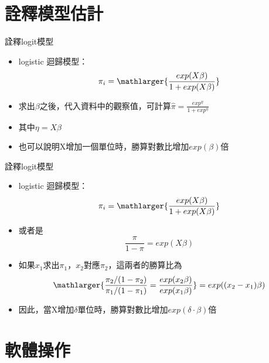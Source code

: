 \documentclass[border=10pt]{beamer}
\begin{document}
\section{詮釋模型估計}
\begin{frame}{詮釋logit模型}
\begin{itemize} 
\item  logistic 迴歸模型：
\begin{equation}
\pi_{i}=\mathlarger{\frac{exp(X\beta)}{1+exp(X\beta)}} 
\end{equation}
\item 求出$\beta$之後，代入資料中的觀察值，可計算$\hat{\pi}=\frac{exp^{\eta}}{1+exp^{\eta}}$
\item 其中$\eta=X\beta$
\item 也可以說明X增加一個單位時，勝算對數比增加$exp(\beta)$倍
\end{itemize}
\end{frame}
\begin{frame}{詮釋logit模型}
\begin{itemize} 
\item  logistic 迴歸模型：
\begin{equation}
\pi_{i}=\mathlarger{\frac{exp(X\beta)}{1+exp(X\beta)}} 
\end{equation}
\item 或者是
\[\frac{\pi}{1-\pi}=exp(X\beta) \]
\item 如果$x_{1}$求出$\pi_{1}$，$x_{2}$對應$\pi_{2}$，這兩者的勝算比為
\[\mathlarger{\frac{\pi_{2}/(1-\pi_{2})}{\pi_{1}/(1-\pi_{1})}=\frac{exp(x_{2}\beta)}{exp(x_{1}\beta)}}=exp((x_{2}-x_{1})\beta) \]
\item 因此，當X增加$\delta$單位時，勝算對數比增加$exp(\delta\cdot\beta)$倍
\end{itemize}
\end{frame}
\section{軟體操作}
\end{document}
